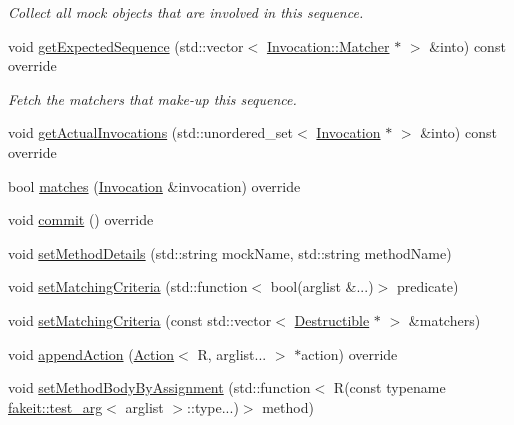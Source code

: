 \begin{DoxyCompactItemize}
\begin{DoxyCompactList}\small\item\em Collect all mock objects that are involved in this sequence. \end{DoxyCompactList}\item 
void \mbox{\hyperlink{classfakeit_1_1MethodMockingContext_ab88d912b17801968fab8443079e2eabc}{get\+Expected\+Sequence}} (std\+::vector$<$ \mbox{\hyperlink{structfakeit_1_1Invocation_1_1Matcher}{Invocation\+::\+Matcher}} $\ast$ $>$ \&into) const override
\begin{DoxyCompactList}\small\item\em Fetch the matchers that make-\/up this sequence. \end{DoxyCompactList}\item 
void \mbox{\hyperlink{classfakeit_1_1MethodMockingContext_ad6803405abfd419799882f837d6f56b6}{get\+Actual\+Invocations}} (std\+::unordered\+\_\+set$<$ \mbox{\hyperlink{structfakeit_1_1Invocation}{Invocation}} $\ast$ $>$ \&into) const override
\item 
bool \mbox{\hyperlink{classfakeit_1_1MethodMockingContext_a240fe9e15cffcebd52f5b0c9ccf87654}{matches}} (\mbox{\hyperlink{structfakeit_1_1Invocation}{Invocation}} \&invocation) override
\item 
void \mbox{\hyperlink{classfakeit_1_1MethodMockingContext_a68a56b3fbd0a2b654a1c72de66e68a71}{commit}} () override
\item 
void \mbox{\hyperlink{classfakeit_1_1MethodMockingContext_a108167e6800e17c71ed5bbed5fcd955a}{set\+Method\+Details}} (std\+::string mock\+Name, std\+::string method\+Name)
\item 
void \mbox{\hyperlink{classfakeit_1_1MethodMockingContext_a43555a14b32453588eb3990a7c6b9a09}{set\+Matching\+Criteria}} (std\+::function$<$ bool(arglist \&...)$>$ predicate)
\item 
void \mbox{\hyperlink{classfakeit_1_1MethodMockingContext_affc5ac50fc419a5f8b5adff8d5d02941}{set\+Matching\+Criteria}} (const std\+::vector$<$ \mbox{\hyperlink{classfakeit_1_1Destructible}{Destructible}} $\ast$ $>$ \&matchers)
\item 
void \mbox{\hyperlink{classfakeit_1_1MethodMockingContext_ad413d04564c89fe134dfb7bae1a1f2a1}{append\+Action}} (\mbox{\hyperlink{structfakeit_1_1Action}{Action}}$<$ R, arglist... $>$ $\ast$action) override
\item 
void \mbox{\hyperlink{classfakeit_1_1MethodMockingContext_ade0a1e36946f68957ee3717147122c4d}{set\+Method\+Body\+By\+Assignment}} (std\+::function$<$ R(const typename \mbox{\hyperlink{structfakeit_1_1test__arg}{fakeit\+::test\+\_\+arg}}$<$ arglist $>$\+::type...)$>$ method)

\end{DoxyCompactItemize}
